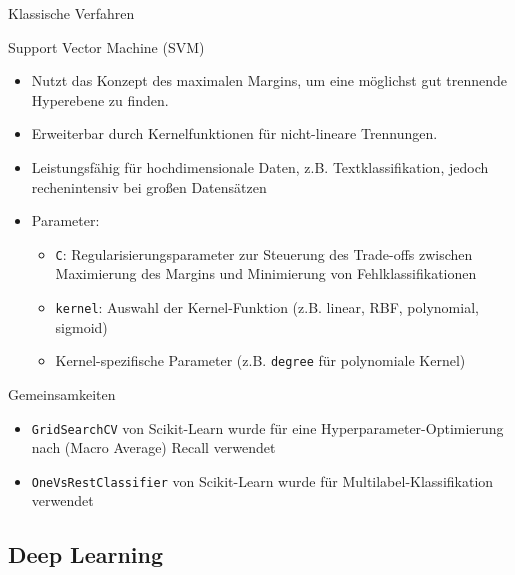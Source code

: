 \documentclass[aspectratio=169]{beamer} %
\begin{document}
\begin{frame}{Klassische Verfahren}
    \begin{block}{Support Vector Machine (SVM)}
        \begin{itemize}
            \item Nutzt das Konzept des maximalen Margins, um eine möglichst gut trennende Hyperebene zu finden.
            \item Erweiterbar durch Kernelfunktionen für nicht-lineare Trennungen.
            \item Leistungsfähig für hochdimensionale Daten, z.B. Textklassifikation, jedoch rechenintensiv bei großen Datensätzen
            \item Parameter:
                  \begin{itemize}
                      \item \texttt{C}: Regularisierungsparameter zur Steuerung des Trade-offs zwischen Maximierung des Margins und Minimierung von Fehlklassifikationen
                      \item \texttt{kernel}: Auswahl der Kernel-Funktion (z.B. linear, RBF, polynomial, sigmoid)
                      \item Kernel-spezifische Parameter (z.B. \texttt{degree} für polynomiale Kernel)
                  \end{itemize}
        \end{itemize}
    \end{block}
\end{frame}


\begin{frame}
    \begin{block}{Gemeinsamkeiten} %
        \begin{itemize}
            \item \texttt{GridSearchCV} von Scikit-Learn wurde für eine Hyperparameter-Optimierung nach (Macro Average) Recall verwendet
            \item \texttt{OneVsRestClassifier} von Scikit-Learn wurde für Multilabel-Klassifikation verwendet
        \end{itemize}
    \end{block}
\end{frame}

\subsection{Deep Learning}
\end{document}
